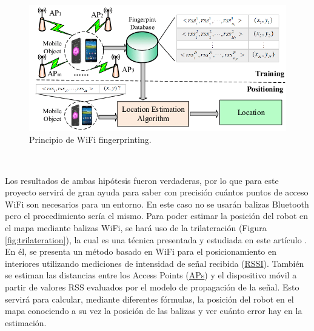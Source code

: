 \begin{figure} [H]
  \begin{center}
    \includegraphics[scale=0.6]{figs/wifi}
  \end{center}
  \caption{Principio de WiFi fingerprinting.}
  \label{fig:wifi}
\end{figure}\

Los resultados de ambas hipótesis fueron verdaderas, por lo que para este proyecto servirá de gran ayuda para saber con precisión cuántos puntos de acceso WiFi son necesarios para un entorno. En este caso no se usarán balizas Bluetooth pero el procedimiento sería el mismo. Para poder estimar la posición del robot en el mapa mediante balizas WiFi, se hará uso de la trilateración (Figura \ref{fig:trilateration}), la cual es una técnica presentada y estudiada en este artículo \cite{inproceedings}. En él, se presenta un método basado en WiFi para el posicionamiento en interiores utilizando mediciones de intensidad de señal recibida (\hyperlink{RSSI}{RSSI}). También se estiman las distancias entre los Access Points (\hyperlink{APs}{APs}) y el dispositivo móvil a partir de valores RSS evaluados por el modelo de propagación de la señal. Esto servirá para calcular, mediante diferentes fórmulas, la posición del robot en el mapa conociendo a su vez la posición de las balizas y ver cuánto error hay en la estimación.\\


